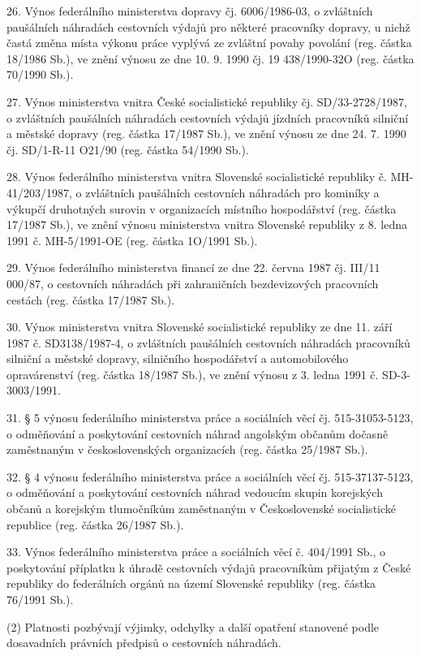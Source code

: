 \documentclass[11pt,a4paper]{article}
\begin{document}
26. Výnos federálního ministerstva dopravy čj. 6006/1986-03, o zvláštních paušálních náhradách cestovních výdajů pro některé pracovníky dopravy, u nichž častá změna místa výkonu práce vyplývá ze zvláštní povahy povolání (reg. částka 18/1986 Sb.), ve znění výnosu ze dne 10. 9. 1990 čj. 19 438/1990-32O (reg. částka 70/1990 Sb.).

27. Výnos ministerstva vnitra České socialistické republiky čj. SD/33-2728/1987, o zvláštních paušálních náhradách cestovních výdajů jízdních pracovníků silniční a městské dopravy (reg. částka 17/1987 Sb.), ve znění výnosu ze dne 24. 7. 1990 čj. SD/1-R-11 O21/90 (reg. částka 54/1990 Sb.).

28. Výnos federálního ministerstva vnitra Slovenské socialistické republiky č. MH-41/203/1987, o zvláštních paušálních cestovních náhradách pro kominíky a výkupčí druhotných surovin v organizacích místního hospodářství (reg. částka 17/1987 Sb.), ve znění výnosu ministerstva vnitra Slovenské republiky z 8. ledna 1991 č. MH-5/1991-OE (reg. částka 1O/1991 Sb.).

29. Výnos federálního ministerstva financí ze dne 22. června 1987 čj. III/11 000/87, o cestovních náhradách při zahraničních bezdevizových pracovních cestách (reg. částka 17/1987 Sb.).

30. Výnos ministerstva vnitra Slovenské socialistické republiky ze dne 11. září 1987 č. SD3138/1987-4, o zvláštních paušálních cestovních náhradách pracovníků silniční a městské dopravy, silničního hospodářství a automobilového opravárenství (reg. částka 18/1987 Sb.), ve znění výnosu z 3. ledna 1991 č. SD-3-3003/1991.

31. § 5 výnosu federálního ministerstva práce a sociálních věcí čj. 515-31053-5123, o odměňování a poskytování cestovních náhrad angolským občanům dočasně zaměstnaným v československých organizacích (reg. částka 25/1987 Sb.).

32. § 4 výnosu federálního ministerstva práce a sociálních věcí čj. 515-37137-5123, o odměňování a poskytování cestovních náhrad vedoucím skupin korejských občanů a korejským tlumočníkům zaměstnaným v Československé socialistické republice (reg. částka 26/1987 Sb.).

33. Výnos federálního ministerstva práce a sociálních věcí č. 404/1991 Sb., o poskytování příplatku k úhradě cestovních výdajů pracovníkům přijatým z České republiky do federálních orgánů na území Slovenské republiky (reg. částka 76/1991 Sb.).

(2) Platnosti pozbývají výjimky, odchylky a další opatření stanovené podle dosavadních právních předpisů o cestovních náhradách.
\end{document}
